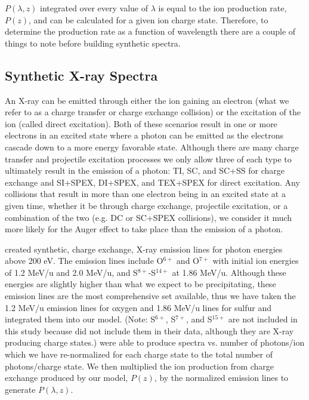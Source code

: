 \documentclass[draft]{agujournal2018}
\begin{document}
$P(\lambda,z)$ integrated over every value of $\lambda$ is equal to the ion production rate, $P(z)$, and can be calculated for a given ion charge state.
Therefore, to determine the production rate as a function of wavelength there are a couple of things to note before building synthetic spectra.

\subsection{Synthetic X-ray Spectra}
\label{sec:SynthXraySpec}

An X-ray can be emitted through either the ion gaining an electron (what we refer to as a charge transfer or charge exchange collision) or the excitation of the ion (called direct excitation).
Both of these scenarios result in one or more electrons in an excited state where a photon can be emitted as the electrons cascade down to a more energy favorable state.
Although there are many charge transfer and projectile excitation processes we only allow three of each type to ultimately result in the emission of a photon: TI, SC, and SC+SS for charge exchange and SI+SPEX, DI+SPEX, and TEX+SPEX for direct excitation.
Any collisions that result in more than one electron being in an excited state at a given time, whether it be through charge exchange, projectile excitation, or a combination of the two (e.g. DC or SC+SPEX collisions), we consider it much more likely for the Auger effect to take place than the emission of a photon.

\citet{hui2010} created synthetic, charge exchange, X-ray emission lines for photon energies above 200 eV.
The emission lines include O$^{6+}$ and O$^{7+}$ with initial ion energies of 1.2 MeV/u and 2.0 MeV/u, and S$^{8+}$-S$^{14+}$ at 1.86 MeV/u.
Although these energies are slightly higher than what we expect to be precipitating, these emission lines are the most comprehensive set available, thus we have taken the 1.2 MeV/u emission lines for oxygen and 1.86 MeV/u lines for sulfur and integrated them into our model.
(Note: S$^{6+}$, S$^{7+}$, and S$^{15+}$ are not included in this study because \citet{hui2010} did not include them in their data, although they are X-ray producing charge states.)
\citet{hui2010} were able to produce spectra vs. number of photons/ion which we have re-normalized for each charge state to the total number of photons/charge state.
We then multiplied the ion production from charge exchange produced by our model, $P(z)$, by the normalized emission lines to generate $P(\lambda,z)$.
\end{document}
